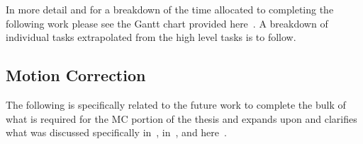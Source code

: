         In more detail and for a breakdown of the time allocated to completing the following work please see the Gantt chart provided here~. A breakdown of individual tasks extrapolated from the high level tasks is to follow.
        
        \subsection{Motion Correction} \label{sec:future_work_motion_correction}
            The following is specifically related to the future work to complete the bulk of what is required for the \gls{MC} portion of the thesis and expands upon and clarifies what was discussed specifically in~, in~, and here~.
            

